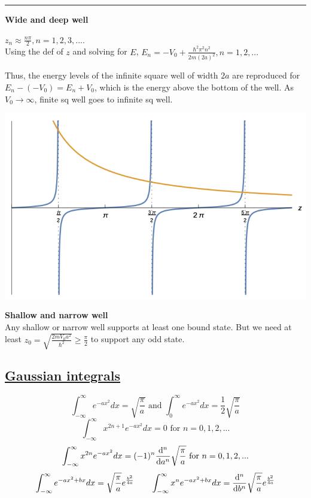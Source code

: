 \medskip
\hrule height 0.3pt \thinspace

\textbf{Wide and deep well} \\

\begin{vwcol}[widths={0.6,0.4},sep=.1cm,rule=0pt,indent=0em] 
$z_n \approx \frac{n \pi}{2}, n = 1, 2, 3, ...$. \\

Using the def of $z$ and solving for $E$, 
$E_n = -V_0 + \frac{\hbar^2 \pi^2 n^2}{2m(2a)^2}, n = 1, 2, ...$

Thus, the energy levels of the infinite square well of width $2a$ are reproduced for $E_n - (-V_0) = E_n + V_0$, which is the energy above the bottom of the well. As $V_0 \rightarrow \infty$, finite sq well goes to infinite sq well.

\columnbreak

\vspace{-1em}
\begin{Figure}
 \raggedright
 \includegraphics[width=0.4\columnwidth]{figures/wide_deep_finite_square_well.png}
\end{Figure}
\vspace{-1em}

\end{vwcol}

\textbf{Shallow and narrow well} \\
Any shallow or narrow well supports at least one bound state. But we need at least $z_0 = \sqrt{\frac{2mV_0 a^2}{\hbar^2}} \geq \frac{\pi}{2}$ to support any odd state.

\subsection{\underline{Gaussian integrals}}
$$\int_{-\infty}^{\infty} e^{-ax^2} dx = \sqrt{\frac{\pi}{a}} \textrm{ and } \int_{0}^{\infty} e^{-ax^2} dx = \frac{1}{2} \sqrt{\frac{\pi}{a}}$$
$$\int_{-\infty}^{\infty} x^{2n+1} e^{-ax^2} dx = 0 \textrm { for } n = 0, 1, 2, ...$$
$$\int_{-\infty}^{\infty} x^{2n} e^{-ax^2} dx = (-1)^n \dv[n]{}{a} \sqrt{\frac{\pi}{a}} \textrm{ for } n = 0, 1, 2, ...$$
$$\int_{-\infty}^{\infty} e^{-ax^2 + bx} dx = \sqrt{\frac{\pi}{a}} e^{\frac{b^2}{4a}}  \qquad  \int_{-\infty}^{\infty} x^n e^{-ax^2 + bx} dx = \dv[n]{}{b} \sqrt{\frac{\pi}{a}} e^{\frac{b^2}{4a}}$$

